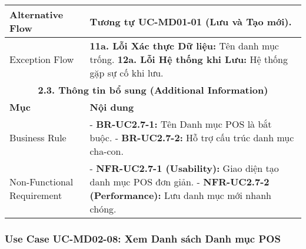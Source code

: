 \begin{longtable}{|m{4cm}|p{11cm}|}
\hline
Alternative Flow & Tương tự UC-MD01-01 (Lưu và Tạo mới). \\
\hline
Exception Flow & \textbf{11a. Lỗi Xác thực Dữ liệu:} Tên danh mục trống. \newline \textbf{12a. Lỗi Hệ thống khi Lưu:} Hệ thống gặp sự cố khi lưu. \\
\hline
\multicolumn{2}{|c|}{\textbf{2.3. Thông tin bổ sung (Additional Information)}} \\
\hline
\textbf{Mục} & \textbf{Nội dung} \\
\hline
Business Rule & - \textbf{BR-UC2.7-1:} Tên Danh mục POS là bắt buộc. \newline - \textbf{BR-UC2.7-2:} Hỗ trợ cấu trúc danh mục cha-con. \\
\hline
Non-Functional Requirement & - \textbf{NFR-UC2.7-1 (Usability):} Giao diện tạo danh mục POS đơn giản. \newline - \textbf{NFR-UC2.7-2 (Performance):} Lưu danh mục mới nhanh chóng. \\
\hline
\end{longtable}

\subsubsection{Use Case UC-MD02-08: Xem Danh sách Danh mục POS}

